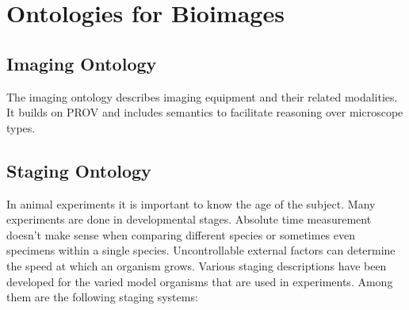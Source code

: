 
\chapter{Ontologies for Bioimages} %

\label{Chapter 3} %



\section{Imaging Ontology}

The imaging
ontology
describes imaging equipment and their related
modalities. It builds on PROV and includes
semantics to facilitate reasoning
over microscope types.


\section{Staging Ontology}

In animal experiments it is important to
know the age of the subject. Many experiments are done in
developmental stages. Absolute time
measurement doesn't make sense when comparing different species or
sometimes even specimens within a single species. Uncontrollable
external factors can determine the speed at which an organism
grows. Various staging descriptions have been developed for the varied
model organisms that are used in experiments. Among them are the
following staging systems:

